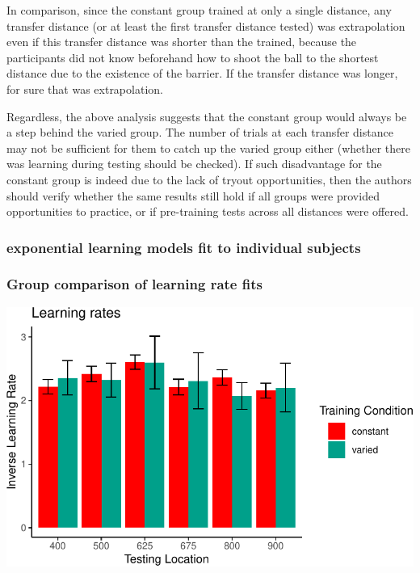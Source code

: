 \documentclass[
  12pt,
  letterpaper,
]{article}
\begin{document}
In comparison, since the constant group trained at only a single
distance, any transfer distance (or at least the first transfer distance
tested) was extrapolation even if this transfer distance was shorter
than the trained, because the participants did not know beforehand how
to shoot the ball to the shortest distance due to the existence of the
barrier. If the transfer distance was longer, for sure that was
extrapolation.

Regardless, the above analysis suggests that the constant group would
always be a step behind the varied group. The number of trials at each
transfer distance may not be sufficient for them to catch up the varied
group either (whether there was learning during testing should be
checked). If such disadvantage for the constant group is indeed due to
the lack of tryout opportunities, then the authors should verify whether
the same results still hold if all groups were provided opportunities to
practice, or if pre-training tests across all distances were offered.

\subsubsection{exponential learning models fit to individual
subjects}\label{exponential-learning-models-fit-to-individual-subjects}

\subsubsection{Group comparison of learning rate
fits}\label{group-comparison-of-learning-rate-fits}

\includegraphics{full_files/figure-pdf/unnamed-chunk-60-1.pdf}
\end{document}
